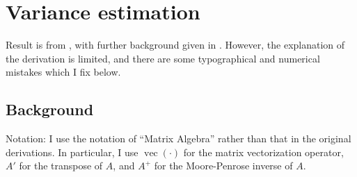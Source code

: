 

\DeclareMathOperator{\vecop}{vec}

\author{Michael McLaren, m.mclaren42@gmail.com}



\maketitle




\section{Variance estimation}


Result is from \textcite{vandenBoogaart2006}, with further background given in
\textcite{Bren2008}. However, the explanation of the derivation is limited, and
there are some typographical and numerical mistakes which I fix below.

\subsection{Background}

Notation: I use the notation of ``Matrix Algebra'' rather than that in the
original derivations. In particular, I use $\vecop(\cdot)$ for the matrix
vectorization operator, $A'$ for the transpose of $A$, and $A^+$ for the
Moore-Penrose inverse of $A$.


